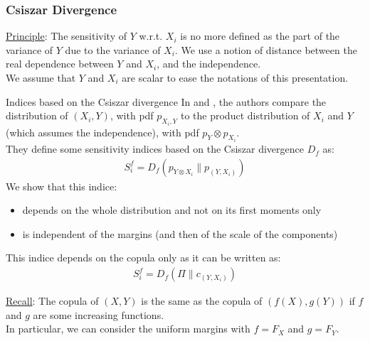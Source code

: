 \documentclass[8pt]{beamer}
\begin{document}
\begin{frame}
 \frametitle{Csiszar Divergence}
\small
\underline{Principle}: The sensitivity of $Y$ w.r.t. $X_i$ is no more defined as the part of the variance of $Y$ due to the variance of $X_i$. We use a notion of distance between the real dependence between $Y$ and $X_i$, and the independence.\\
We assume that $Y$ and $X_i$ are scalar to ease the notations of this presentation.

\begin{block}{Indices based on the Csiszar divergence}
 In \cite{Borgonovo2016} and \cite{DaVeiga2013} , the authors compare the distribution of  $(X_i,Y)$, with pdf $p_{X_i,Y}$ to the product distribution of $X_i$ and $Y$ (which assumes the independence), with pdf $p_{Y}\otimes p_{X_i}$. \\
 They define some sensitivity indices based on the  \alert{Csiszar divergence $D_f$} as:
    \begin{align*}
      S_i^f= D_f(p_{Y \otimes X_i} \| p_{(Y,X_i)})
    \end{align*}
 We show that this indice: 
 \begin{itemize}
  \item depends on the whole distribution and not on its first moments only
  \item is independent of the margins (and then of the scale of the components)
 \end{itemize}
This indice  depends on the copula only as it can be written as:
    \alert{\begin{align*}
      S_i^f= D_f(\Pi \| c_{(Y,X_i)})
    \end{align*}}

\end{block}

\underline{Recall}: The copula of $(X,Y)$ is the same as the copula of $(f(X), g(Y))$ if $f$ and $g$ are some increasing functions.\\
In particular, we can consider the uniform margins with  $f = F_X$ and $g = F_Y$.
\end{frame}



\end{document}
